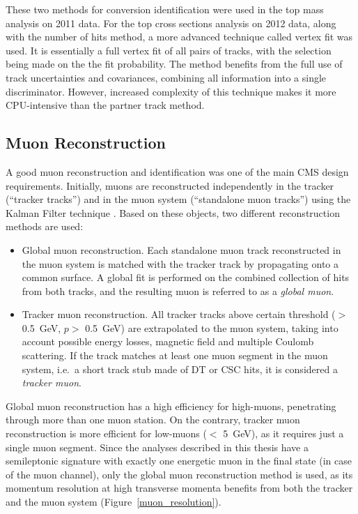 These two methods for conversion identification were used in the top mass analysis on 2011 data. For the top cross
sections analysis on 2012 data, along with the number of hits method, a more advanced technique called vertex fit was
used. It is essentially a full vertex fit of all pairs of tracks, with the selection being made on the the fit
probability. The method benefits from the full use of track uncertainties and covariances, combining all information
into a single discriminator. However, increased complexity of this technique makes it more CPU-intensive than the
partner track method.


\subsection{Muon Reconstruction}
\label{ss:muon_reconstruction}
A good muon reconstruction and identification was one of the main CMS design requirements. Initially, muons are
reconstructed independently in the tracker (``tracker tracks'') and in the muon system (``standalone muon tracks'')
using the Kalman Filter technique \cite{KF}. Based on these objects, two different reconstruction methods are used:
\cite{muon_reconstruction}

\begin{itemize}
  \item Global muon reconstruction. Each standalone muon track reconstructed in the muon system is matched with the
  tracker track by propagating onto a common surface. A global fit is performed on the combined collection of hits from
  both tracks, and the resulting muon is referred to as a \textit{global muon}.
  \item Tracker muon reconstruction. All tracker tracks above certain threshold (\pt $>$ \SI{0.5}{\GeV}, $p >$
  \SI{0.5}{\GeV}) are extrapolated to the muon system, taking into account possible energy losses, magnetic field and
  multiple Coulomb scattering. If the track matches at least one muon segment in the muon system, i.e.\ a short track
  stub made of DT or CSC hits, it is considered a \textit{tracker muon}.
\end{itemize}

Global muon reconstruction has a high efficiency for high-\pt muons, penetrating through more than one muon station. On
the contrary, tracker muon reconstruction is more efficient for low-\pt muons (\pt $<$ \SI{5}{\GeV}), as it requires
just a single muon segment. Since the \ttbar analyses described in this thesis have a semileptonic signature with
exactly one energetic muon in the final state (in case of the muon channel), only the global muon reconstruction method
is used, as its momentum resolution at high transverse momenta benefits from both the tracker and the muon system
(Figure~\ref{muon_resolution}).

